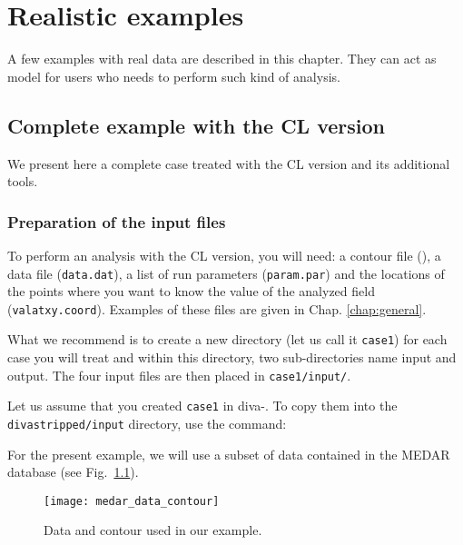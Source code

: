 \chapter{Realistic examples\label{chap:examples}}

A few examples with real data are described in this chapter. They can act as model for users who needs to perform such kind of analysis. 

\minitoc

\newpage

\section{Complete example with the CL version}

We present here a complete case treated with the CL version and its additional tools.


\subsection{Preparation of the input files\label{prep}}

To perform an analysis with the CL version, you will need: a contour file (), a data file (\texttt{data.dat}), a list of run parameters (\texttt{param.par}) and the locations of the points where you want to know the value of the analyzed field (\texttt{valatxy.coord}). Examples of these files are given in Chap. \ref{chap:general}.

What we recommend is to create a new directory (let us call it \texttt{case1}) for each case you will treat and within this directory, two sub-directories name input and output. The four input files are then placed in \texttt{case1/input/}. 

Let us assume that you created \texttt{case1} in diva-\divaversion. To copy them into the \texttt{diva\-stripped/\-input} directory, use the command: 

\vspace{.25cm}


For the present example, we will use a subset of data contained in the MEDAR database (see Fig.~\ref{dataplotCL}). 

\begin{figure}[htpb]
\centering
\parbox{.65\textwidth}{
\texttt{[image: medar\_data\_contour]}
}\parbox{.35\textwidth}{
\caption{Data and contour used in our example.\label{dataplotCL}}
}
\end{figure}


